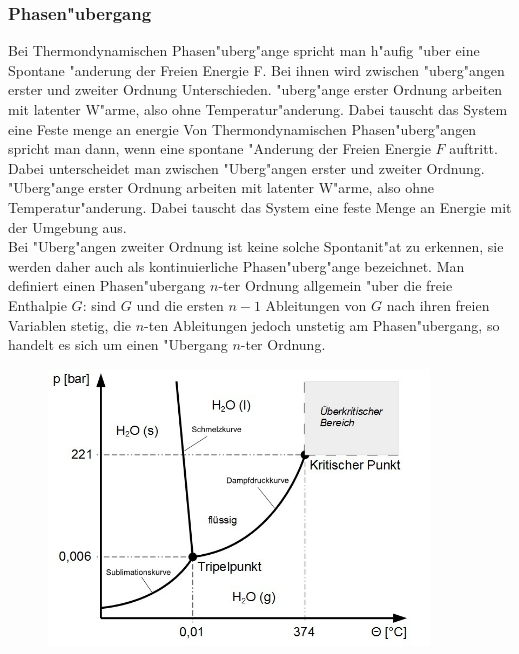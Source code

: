         \subsubsection*{Phasen"ubergang}
            Bei Thermondynamischen Phasen"uberg"ange spricht man h"aufig "uber eine Spontane "anderung der Freien Energie F.
            Bei ihnen wird zwischen "uberg"angen erster und zweiter Ordnung Unterschieden. "uberg"ange erster Ordnung
            arbeiten mit latenter W"arme, also ohne Temperatur"anderung. Dabei tauscht das System eine Feste menge an energie
            Von Thermondynamischen Phasen"uberg"angen spricht man dann, wenn eine spontane "Anderung der Freien Energie $F$ auftritt.
            Dabei unterscheidet man zwischen "Uberg"angen erster und zweiter Ordnung. "Uberg"ange erster Ordnung
            arbeiten mit latenter W"arme, also ohne Temperatur"anderung. Dabei tauscht das System eine feste Menge an Energie
            mit der Umgebung aus.\\
            Bei "Uberg"angen zweiter Ordnung ist keine solche Spontanit"at zu erkennen, sie werden daher auch als kontinuierliche Phasen"uberg"ange bezeichnet.
            Man definiert einen Phasen"ubergang $n$-ter Ordnung allgemein "uber die freie Enthalpie $G$: sind $G$ und die ersten $n-1$ Ableitungen von $G$ nach ihren freien Variablen stetig, 
            die $n$-ten Ableitungen jedoch unstetig am Phasen"ubergang, so handelt es sich um einen "Ubergang $n$-ter Ordnung.

            \begin{figure}[H]
                \centering
                \includegraphics[width=0.9\textwidth]{Images/waterphase.jpg}
            \end{figure}

